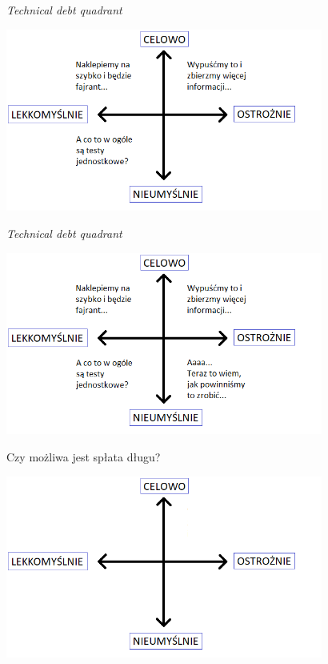 \documentclass{beamer}
\begin{document}
\begin{frame}{\textit{Technical debt quadrant}}
\begin{center}
  	\includegraphics[height=6cm]{technical_debt_quadrant5.png}
\end{center}
\end{frame}

\begin{frame}{\textit{Technical debt quadrant}}
\begin{center}
  	\includegraphics[height=6cm]{technical_debt_quadrant6.png}
\end{center}
\end{frame}

\begin{frame}{Czy możliwa jest spłata długu{?}}
\begin{center}
  	\includegraphics[height=6cm]{splata_dlugu1.png}
\end{center}
\end{frame}
\end{document}
